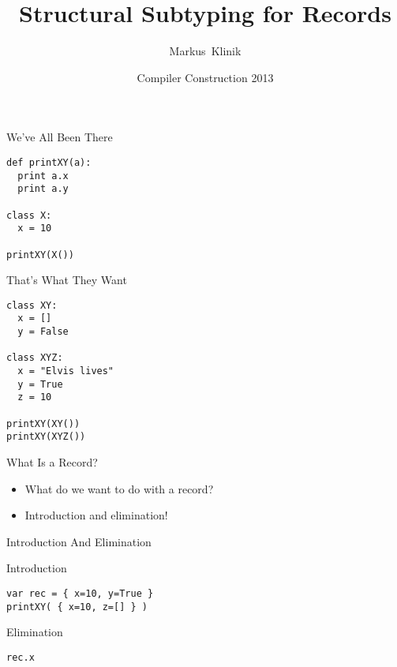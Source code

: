 \documentclass{beamer}
\title
{Structural Subtyping for Records}
\author
{Markus~Klinik}
\institute[Radboud University Nijmegen]
{
  Radboud University Nijmegen
}
\date
{Compiler Construction 2013}
\begin{document}
\begin{frame}
  \titlepage
\end{frame}

\begin{frame}[fragile]{We've All Been There}

\begin{verbatim}
def printXY(a):
  print a.x
  print a.y

class X:
  x = 10

printXY(X())
\end{verbatim}

\end{frame}

\begin{frame}[fragile]{That's What They Want}

\begin{verbatim}
class XY:
  x = []
  y = False

class XYZ:
  x = "Elvis lives"
  y = True
  z = 10

printXY(XY())
printXY(XYZ())
\end{verbatim}

\end{frame}


\begin{frame}{What Is a Record?}

\begin{itemize}
  \item What do we want to do with a record?
  \item Introduction and elimination!
\end{itemize}

\end{frame}


\begin{frame}[fragile]{Introduction And Elimination}

\onslide<+->

Introduction

\begin{verbatim}
var rec = { x=10, y=True }
printXY( { x=10, z=[] } )
\end{verbatim}

\onslide<+->

Elimination

\begin{verbatim}
rec.x
\end{verbatim}

\end{frame}
\end{document}
